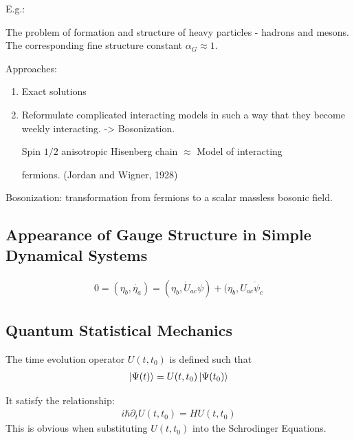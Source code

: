 E.g.:

The problem of formation and structure of heavy particles - hadrons and mesons. The corresponding fine structure constant $\alpha_G\approx 1$.

Approaches:
\begin{enumerate}
        \item Exact solutions
        \item Reformulate complicated interacting models in such a way
                that they become weekly interacting. -> Bosonization.
                
                Spin $1/2$ anisotropic Hisenberg chain $\approx$
                Model of interacting

                fermions.
                (Jordan and Wigner, 1928)
\end{enumerate}
Bosonization: transformation from fermions to a scalar massless bosonic
field.

\subsection{Appearance of Gauge Structure in Simple Dynamical Systems}

\begin{align}
    0=(\eta_b,\dot{\eta_a}) = (\eta_b,\dot{U}_{ac}\psi) +
        (\eta_b,U_{ac}\dot{\psi}_c
\end{align}
\subsection{Quantum Statistical Mechanics}
\label{sec:Quantum Statistical Mechanics}
\begin{defi}
    The time evolution operator $U(t,t_0)$ is defined such that
    \begin{align}
        \label{eq:def_time_evo_op}
        \ket{\Psi(t)} = U(t,t_0) \ket{\Psi(t_0)}
    \end{align}
\end{defi}
It satisfy the relationship:
\begin{align}
    \label{eq:def_time_evo_op 2}
    i\hbar \partial_t U(t,t_0)= H U(t,t_0)
\end{align}
This is obvious when substituting $U(t,t_0)$ into the Schrodinger 
Equations.

